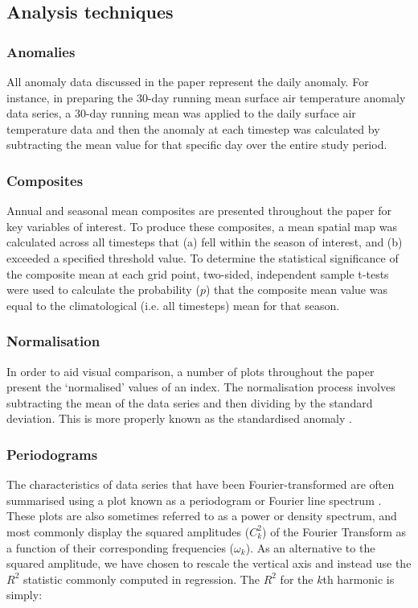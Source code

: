 \subsection{Analysis techniques}

\subsubsection{Anomalies}
All anomaly data discussed in the paper represent the daily anomaly. For instance, in preparing the 30-day running mean surface air temperature anomaly data series, a 30-day running mean was applied to the daily surface air temperature data and then the anomaly at each timestep was calculated by subtracting the mean value for that specific day over the entire study period.

\subsubsection{Composites}
Annual and seasonal mean composites are presented throughout the paper for key variables of interest. To produce these composites, a mean spatial map was calculated across all timesteps that (a) fell within the season of interest, and (b) exceeded a specified threshold value. To determine the statistical significance of the composite mean at each grid point, two-sided, independent sample t-tests were used to calculate the probability ($p$) that the composite mean value was equal to the climatological (i.e. all timesteps) mean for that season.

\subsubsection{Normalisation}
In order to aid visual comparison, a number of plots throughout the paper present the `normalised' values of an index. The normalisation process involves subtracting the mean of the data series and then dividing by the standard deviation. This is more properly known as the standardised anomaly \citep{Wilks2011}. 

\subsubsection{Periodograms} %
The characteristics of data series that have been Fourier-transformed are often summarised using a plot known as a periodogram or Fourier line spectrum \citep{Wilks2011}. These plots are also sometimes referred to as a power or density spectrum, and most commonly display the squared amplitudes ($C_k^2$) of the Fourier Transform as a function of their corresponding frequencies ($\omega_k$). As an alternative to the squared amplitude, we have chosen to rescale the vertical axis and instead use the $R^2$ statistic commonly computed in regression. The $R^2$ for the $k$th harmonic is simply:

